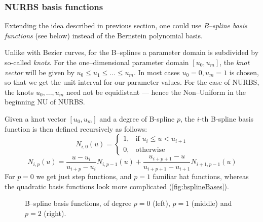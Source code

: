 \subsubsection{NURBS basis functions}
Extending the idea described in previous section, one could use \emph{B--spline basis functions} (see below) instead of the Bernstein polynomial basis.

Unlike with Bezier curves, for the B--splines a parameter domain is subdivided by so-called \textit{knots}. For the one--dimensional parameter domain $[u_{0}, u_{m}]$, the \textit{knot vector} will be given by $u_{0} \leq u_{1} \leq ... \leq u_{m}$. In most cases $u_{0} = 0, u_{m} = 1$ is chosen, so that we get the unit interval for our parameter values. For the case of NURBS, the knots $u_{0},..., u_{m}$ need not be equidistant --- hence the Non--Uniform in the beginning NU of NURBS.

Given a knot vector $[u_{0}, u_{m}]$ and a degree of B-spline $p$, the $i$-th B-spline basis function is then defined recursively as follows:
\begin{equation}
N_{i,0}(u) =  \begin{cases} 1, & \mbox{if } u_{i} \leq u < u_{i+1} \\ 0, & \mbox{otherwise } \end{cases}
\end{equation} 
\begin{equation}
N_{i,p}(u) = \frac{u - u_{i}}{u_{i+p} - u_{i}}N_{i, p-1}(u)  + \frac{u_{i+p+1}-u}{u_{i+p+1} - u_{i+1}}N_{i+1, p-1}(u)
\end{equation}
For $p=0$ we get just step functions, and $p=1$ familiar hat functions, whereas the quadratic basis functions look more complicated (\autoref{fig:bsplineBases}).
\begin{figure}
\centering
\begin{subfigure}[B--spline basis for $p=0$]{
  \texttt{[image: basis\_constant.eps]}}
  \label{fig:bspline_basis_constant}
\end{subfigure}%
\begin{subfigure}[B--spline basis for $p=1$]{
  \texttt{[image: basis\_linear.eps]}}
  \label{fig:bspline_basis_linear}
\end{subfigure}
\begin{subfigure}[B--spline basis for $p=2$]{
  \texttt{[image: basis\_quadratic.eps]}}
  \label{fig:lognorm_quadratic}
\end{subfigure}
\caption{B--spline basis functions, of degree $p=0$ (left), $p=1$ (middle) and $p=2$ (right).}
\label{fig:bsplineBases}
\end{figure}



